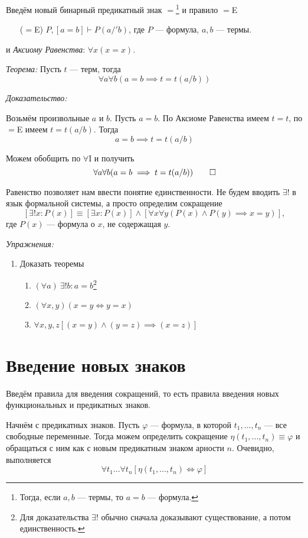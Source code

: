 Введём новый бинарный предикатный знак $=$\footnote{
	Тогда, если $a,b$	 --- термы, то $a=b$ --- формула.}
и правило $=$E
\begin{enumerate}
	\item[($=$E)]{}$P,[a=b]\vdash P(a/'b)$,
		где $P$ --- формула, $a,b$ --- термы.
\end{enumerate}
и {\it Аксиому Равенства}: $\forall x(x=x)$.

\vspace{1em}
{\it Теорема:} Пусть $t$ --- терм, тогда
\[
	\forall a\forall b(a=b\implies t=t(a/b))
\]

{\it Доказательство:}

Возьмём произвольные $a$ и $b$. Пусть $a=b$.
По Аксиоме Равенства имеем $t=t$, по $=$E имеем $t=t(a/b)$.
Тогда
\[
	a=b\implies t=t(a/b)
\]

Можем обобщить по $\forall$I и получить
\[
	\forall a\forall b(a=b\implies t=t(a/b))
	\qed
\]

Равенство позволяет нам ввести понятие единственности.
Не будем вводить $\exists!$ в язык формальной системы, а просто определим сокращение
\[
	[\exists! x:P(x)]\equiv[\exists x:P(x)]\land
	[\forall x\forall y(P(x)\land P(y)\implies x=y)],
\]
где $P(x)$ --- формула о $x$, не содержащая $y$.

\vspace{1em}
{\it Упражнения:}
\begin{enumerate}
	\item{}Доказать теоремы
		\begin{enumerate}
			\item{}$(\forall a)~\exists! b:a=b$\footnote{
					Для доказательства $\exists!$ обычно сначала
					доказывают существование, а потом единственность.
				}
			\item{}$(\forall x,y)(x=y\iff y=x)$
			\item{}$\forall x,y,z[(x=y)\land (y=z)\implies (x=z)]$
		\end{enumerate}
\end{enumerate}

\section{Введение новых знаков}

Введём правила для введения сокращений, то есть правила введения новых функциональных
и предикатных знаков.

Начнём с предикатных знаков. Пусть $\varphi$ --- формула, в которой $t_1,...,t_{n}$ --- все
свободные переменные. Тогда можем определить сокращение $\eta(t_1,...,t_{n})\equiv\varphi$
и обращаться с ним как с новым предикатным знаком арности $n$.
Очевидно, выполняется
\[
	\forall t_1...\forall t_{n}[\eta(t_1,...,t_{n})\iff\varphi]
\]

